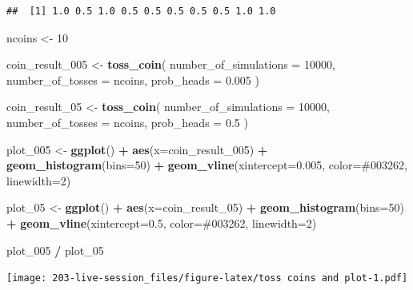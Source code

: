 \documentclass[
]{book}
\newenvironment{Shaded}{\begin{snugshade}}{\end{snugshade}}
\newcommand{\AttributeTok}[1]{\textcolor[rgb]{0.13,0.29,0.53}{#1}}
\newcommand{\DecValTok}[1]{\textcolor[rgb]{0.00,0.00,0.81}{#1}}
\newcommand{\FloatTok}[1]{\textcolor[rgb]{0.00,0.00,0.81}{#1}}
\newcommand{\FunctionTok}[1]{\textcolor[rgb]{0.13,0.29,0.53}{\textbf{#1}}}
\newcommand{\NormalTok}[1]{#1}
\newcommand{\OtherTok}[1]{\textcolor[rgb]{0.56,0.35,0.01}{#1}}
\newcommand{\SpecialCharTok}[1]{\textcolor[rgb]{0.81,0.36,0.00}{\textbf{#1}}}
\newcommand{\StringTok}[1]{\textcolor[rgb]{0.31,0.60,0.02}{#1}}
\theoremstyle{definition}
\theoremstyle{definition}
\theoremstyle{definition}
\theoremstyle{definition}
\theoremstyle{remark}
\begin{document}
\begin{verbatim}
##  [1] 1.0 0.5 1.0 0.5 0.5 0.5 0.5 0.5 1.0 1.0
\end{verbatim}

\begin{Shaded}
\begin{Highlighting}[]
\NormalTok{ncoins }\OtherTok{\textless{}{-}} \DecValTok{10}

\NormalTok{coin\_result\_005 }\OtherTok{\textless{}{-}} \FunctionTok{toss\_coin}\NormalTok{(}
  \AttributeTok{number\_of\_simulations =} \DecValTok{10000}\NormalTok{,}
  \AttributeTok{number\_of\_tosses =}\NormalTok{ ncoins, }
  \AttributeTok{prob\_heads =} \FloatTok{0.005}
\NormalTok{  )}

\NormalTok{coin\_result\_05 }\OtherTok{\textless{}{-}} \FunctionTok{toss\_coin}\NormalTok{(}
  \AttributeTok{number\_of\_simulations =} \DecValTok{10000}\NormalTok{,}
  \AttributeTok{number\_of\_tosses =}\NormalTok{ ncoins, }
  \AttributeTok{prob\_heads =} \FloatTok{0.5}
\NormalTok{  )}

\NormalTok{plot\_005 }\OtherTok{\textless{}{-}} \FunctionTok{ggplot}\NormalTok{() }\SpecialCharTok{+} 
    \FunctionTok{aes}\NormalTok{(}\AttributeTok{x=}\NormalTok{coin\_result\_005) }\SpecialCharTok{+} 
    \FunctionTok{geom\_histogram}\NormalTok{(}\AttributeTok{bins=}\DecValTok{50}\NormalTok{) }\SpecialCharTok{+} 
    \FunctionTok{geom\_vline}\NormalTok{(}\AttributeTok{xintercept=}\FloatTok{0.005}\NormalTok{, }\AttributeTok{color=}\StringTok{\textquotesingle{}\#003262\textquotesingle{}}\NormalTok{, }\AttributeTok{linewidth=}\DecValTok{2}\NormalTok{)}

\NormalTok{plot\_05 }\OtherTok{\textless{}{-}} \FunctionTok{ggplot}\NormalTok{() }\SpecialCharTok{+} 
    \FunctionTok{aes}\NormalTok{(}\AttributeTok{x=}\NormalTok{coin\_result\_05) }\SpecialCharTok{+} 
    \FunctionTok{geom\_histogram}\NormalTok{(}\AttributeTok{bins=}\DecValTok{50}\NormalTok{) }\SpecialCharTok{+} 
    \FunctionTok{geom\_vline}\NormalTok{(}\AttributeTok{xintercept=}\FloatTok{0.5}\NormalTok{, }\AttributeTok{color=}\StringTok{\textquotesingle{}\#003262\textquotesingle{}}\NormalTok{, }\AttributeTok{linewidth=}\DecValTok{2}\NormalTok{)}

\NormalTok{plot\_005 }\SpecialCharTok{/} 
\NormalTok{  plot\_05}
\end{Highlighting}
\end{Shaded}

\texttt{[image: 203-live-session\_files/figure-latex/toss coins and plot-1.pdf]}
\end{document}

